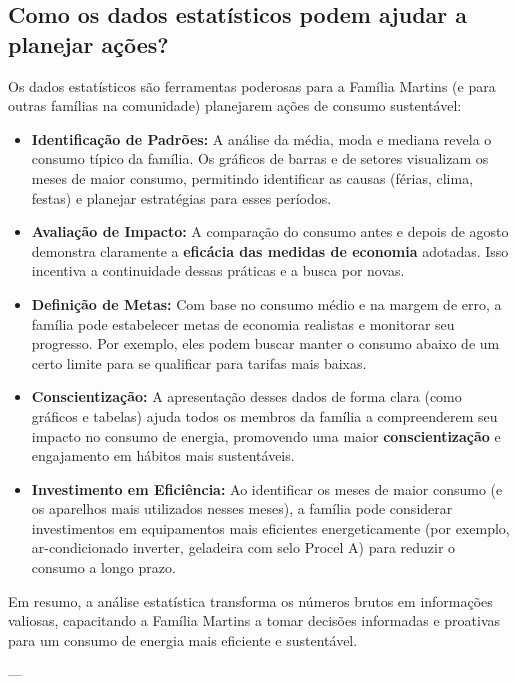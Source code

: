 \documentclass{article}
\begin{document}
\subsection*{Como os dados estatísticos podem ajudar a planejar ações?}
Os dados estatísticos são ferramentas poderosas para a Família Martins (e para outras famílias na comunidade) planejarem ações de consumo sustentável:
\begin{itemize}
    \item \textbf{Identificação de Padrões:} A análise da média, moda e mediana revela o consumo típico da família. Os gráficos de barras e de setores visualizam os meses de maior consumo, permitindo identificar as causas (férias, clima, festas) e planejar estratégias para esses períodos.
    \item \textbf{Avaliação de Impacto:} A comparação do consumo antes e depois de agosto demonstra claramente a \textbf{eficácia das medidas de economia} adotadas. Isso incentiva a continuidade dessas práticas e a busca por novas.
    \item \textbf{Definição de Metas:} Com base no consumo médio e na margem de erro, a família pode estabelecer metas de economia realistas e monitorar seu progresso. Por exemplo, eles podem buscar manter o consumo abaixo de um certo limite para se qualificar para tarifas mais baixas.
    \item \textbf{Conscientização:} A apresentação desses dados de forma clara (como gráficos e tabelas) ajuda todos os membros da família a compreenderem seu impacto no consumo de energia, promovendo uma maior \textbf{conscientização} e engajamento em hábitos mais sustentáveis.
    \item \textbf{Investimento em Eficiência:} Ao identificar os meses de maior consumo (e os aparelhos mais utilizados nesses meses), a família pode considerar investimentos em equipamentos mais eficientes energeticamente (por exemplo, ar-condicionado inverter, geladeira com selo Procel A) para reduzir o consumo a longo prazo.
\end{itemize}
Em resumo, a análise estatística transforma os números brutos em informações valiosas, capacitando a Família Martins a tomar decisões informadas e proativas para um consumo de energia mais eficiente e sustentável.

---
\end{document}
